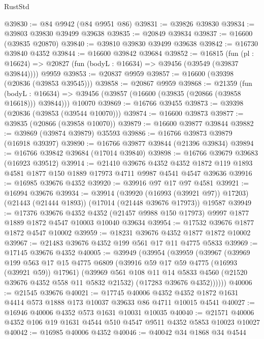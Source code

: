 \begin{lexlean}{RustStd}
\begin{coremodule}
{\begin{coremodule}
{{{{{{{{{{{{{{{{{{{{{{{{{{{{{{{{{{{{{{{{{{{{{{{{{{{{{{{@39830 := @84 @9942 (@84 @9951 @86)
@39831 := @39826 @39830
@39834 := @39803 @39830 @39499 @39638
@39835 := @20849 @39834
@39837 := @16600 (@39835 @20870)
@39840 := @39810 @39830 @39499 @39638
@39842 := @16730 @39840 @4352
@39844 := @16600 @39842 @39684
@39852 := @16815
    (fun (pl : @16624) => @20827 (fun (bodyL : @16634) => @39456 (@39549 (@39837 @39844))))
    @9959
@39853 := @20837 @9959
@39857 := @16600 (@39398 (@20836 (@39853 @39545)))
@39858 := @20867 @9959
@39868 := @21359
    (fun (bodyL : @16634) => @39456 (@39857 (@16600 (@39835 (@20866 (@39858 @16618))) @39844)))
    @10070
@39869 := @16766 @39455
@39873 := @39398 (@20836 (@39853 (@39544 @10070)))
@39874 := @16600 @39873
@39877 := @39835 (@20866 (@39858 @10070))
@39879 := @16600 @39877 @39844
@39882 := @39869 (@39874 @39879) @35593
@39886 := @16766 @39873 @39879 (@16918 @39397)
@39890 := @16766 @39877 @39844 (@21396 @39834)
@39894 := @16766 @39842 @39684 (@17014 @39840)
@39898 := @16766 @39679 @39683 (@16923 @39512)
@39914 := @21410
    @39676
    @4352
    @4352
    @1872
    @119
    @1893
    @4581
    @1877
    @150
    @1889
    @17973
    @4711
    @9987
    @4541
    @4547
    @39636
@39916 := @16985 @39676 @4352
@39920 := @39916 @97 @17 @97 @4581
@39921 := @16994 @39676
@39934 := @39914
    (@39920 (@16993 (@39921 @97)) @17203)
    (@21443 (@21444 @1893))
    (@17014 (@21448 @39676 @17973))
    @19587
@39949 := @17376
    @39676
    @4352
    @4352
    (@21457 @9988 @150 @17973)
    @9997
    @1877
    @1889
    @1872
    @4547
    @10003
    @10040
    @39634
@39954 := @17532 @39676 @1877 @1872 @4547 @10002
@39959 := @18231 @39676 @4352 @1877 @1872 @10002
@39967 := @21483 @39676 @4352 @199 @561 @17 @11 @4775 @5833
@39969 := @17145 @39676 @4352
@40005 := @39949
    (@39954
      (@39959
        (@39967
          (@39969
            @199
            @563
            @17
            @15
            @4775
            @6809
            (@39916 @59 @17 @59 @4775 (@16993 (@39921 @59)) @17961)
            (@39969
              @561
              @108
              @11
              @14
              @5833
              @4560
              (@21520 @39676 @4352 @558 @11 @5832 @21532)
              (@17283 @39676 @4352))))))
@40006 := @21545 @39676
@40021 := @17745
    @40006
    @4352
    @4352
    @1872
    @1631
    @4414
    @573
    @1888
    @173
    @10037
    @39633
    @86
    @4711
    @10015
    @4541
@40027 := @16946 @40006 @4352 @573 @1631 @10031 @10035
@40040 := @21571 @40006 @4352 @106 @19 @1631 @4544 @510 @4547 @9511 @4352 @5853 @10023 @10027
@40042 := @16985 @40006 @4352
@40046 := @40042 @34 @1868 @34 @4544
}}}}}}}}}}}}}}}}}}}}}}}}}}}}}}}}}}}}}}}}}}}}}}}}}}}}}}}
\end{coremodule}}
\end{coremodule}
\end{lexlean}
